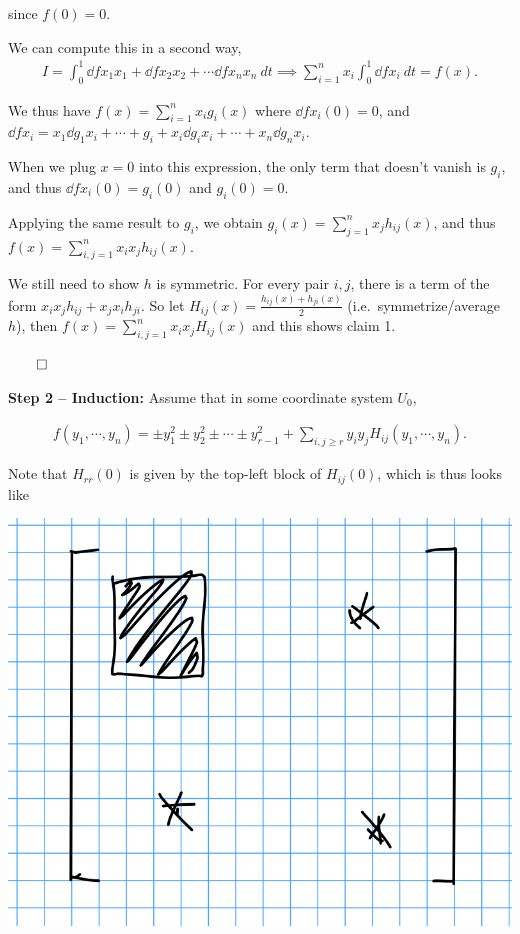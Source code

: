 since \(f(0) = 0\).

We can compute this in a second way, \begin{align*}
I = \int_0^1 \dd{f}{x_1} x_1 + \dd{f}{x_2} x_2 + \cdots \dd{f}{x_n} x_n ~dt 
\implies \sum_{i=1}^n x_i \int_0^1  \dd{f}{x_i} ~dt = f(x)
.\end{align*}

We thus have \(f(x) = \sum_{i=1}^n x_i g_i(x)\) where
\(\dd{f}{x_i}(0) = 0\), and
\(\dd{f}{x_i} = x_1 \dd{g_1}{x_i} + \cdots + g_i + x_i \dd{g_i}{x_i} + \cdots + x_n \dd{g_n}{x_i}\).

When we plug \(x = 0\) into this expression, the only term that doesn't
vanish is \(g_i\), and thus \(\dd{f}{x_i}(0) = g_i(0)\) and
\(g_i(0) = 0\).

Applying the same result to \(g_i\), we obtain
\(g_i(x) = \sum_{j=1}^n x_j h_{ij}(x)\), and thus
\(f(x) = \sum_{i, j =1}^n x_i x_j h_{ij}(x)\).

We still need to show \(h\) is symmetric. For every pair \(i, j\), there
is a term of the form \(x_i x_j h_{ij} + x_j x_i h_{ji}\). So let
\(H_{ij}(x) = \frac{h_{ij}(x) + h_{ji}(x)}{2}\) (i.e.~symmetrize/average
\(h\)), then \(f(x) = \sum_{i, j = 1}^n x_i x_j H_{ij}(x)\) and this
shows claim 1.

\(\qed\)

\textbf{Step 2 -- Induction:} Assume that in some coordinate system
\(U_0\),

\begin{align*}
f(y_1, \cdots, y_n) = \pm y_1^2 \pm y_2^2 \pm \cdots \pm y_{r-1}^2 + \sum_{i, j \geq r} y_i y_j H_{ij}(y_1, \cdots, y_n)
.\end{align*}

Note that \(H_{rr}(0)\) is given by the top-left block of \(H_{ij}(0)\),
which is thus looks like

\includegraphics{figures/2020-01-09-11:41.png}\\


